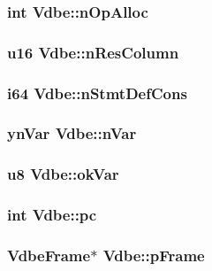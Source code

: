 \subsubsection{\setlength{\rightskip}{0pt plus 5cm}int \bf{Vdbe::n\-Op\-Alloc}}\label{structVdbe_bafb46d45fe3d61fb0735ccd2c191465}


\subsubsection{\setlength{\rightskip}{0pt plus 5cm}\bf{u16} \bf{Vdbe::n\-Res\-Column}}\label{structVdbe_e7bfd970c9ee6350a26cc341adf045b9}


\subsubsection{\setlength{\rightskip}{0pt plus 5cm}\bf{i64} \bf{Vdbe::n\-Stmt\-Def\-Cons}}\label{structVdbe_c8a0554b8072a70046ae9eabf9493ee4}


\subsubsection{\setlength{\rightskip}{0pt plus 5cm}\bf{yn\-Var} \bf{Vdbe::n\-Var}}\label{structVdbe_5345f39939526b7f46b16048baf1dec0}


\subsubsection{\setlength{\rightskip}{0pt plus 5cm}\bf{u8} \bf{Vdbe::ok\-Var}}\label{structVdbe_ded51f1dda8495c0cec3906c79010d26}


\subsubsection{\setlength{\rightskip}{0pt plus 5cm}int \bf{Vdbe::pc}}\label{structVdbe_0d6fe7ae1582d66464c4dca5674d6c4f}


\subsubsection{\setlength{\rightskip}{0pt plus 5cm}\bf{Vdbe\-Frame}$\ast$ \bf{Vdbe::p\-Frame}}\label{structVdbe_638706edb365f926e4c5b3d08ea65389}


